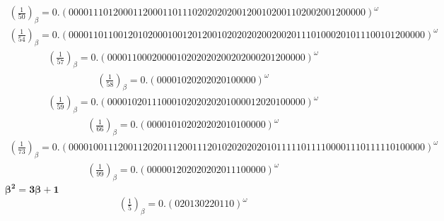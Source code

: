 \documentclass[fleqn]{article}
\begin{document}
\begin{equation*}
\begin{split}
(\frac{1}{50})_\beta = 0.(000011101200011200011011102020202001200102001102002001200000)^\omega
\end{split}\end{equation*}
\begin{equation*}
\begin{split}
(\frac{1}{54})_\beta = 0.(000011011001201020001001201200102020202002002011101000201011100101200000)^\omega
\end{split}\end{equation*}
\begin{equation*}
\begin{split}
(\frac{1}{57})_\beta = 0.(0000110002000010202020200202000201200000)^\omega
\end{split}\end{equation*}
\begin{equation*}
\begin{split}
(\frac{1}{58})_\beta = 0.(00001020202020100000)^\omega
\end{split}\end{equation*}
\begin{equation*}
\begin{split}
(\frac{1}{59})_\beta = 0.(0000102011100010202020201000012020100000)^\omega
\end{split}\end{equation*}
\begin{equation*}
\begin{split}
(\frac{1}{66})_\beta = 0.(000010102020202010100000)^\omega
\end{split}\end{equation*}
\begin{equation*}
\begin{split}
(\frac{1}{73})_\beta = 0.(000010011120011202011120011120102020202010111110111100001110111110100000)^\omega
\end{split}\end{equation*}
\begin{equation*}
\begin{split}
(\frac{1}{99})_\beta = 0.(000001202020202011100000)^\omega
\end{split}\end{equation*}
$\boldsymbol{\beta^2 = 3\beta + 1}$
\begin{equation*}
\begin{split}
(\frac{1}{5})_\beta = 0.(020130220110)^\omega
\end{split}\end{equation*}
\end{document}
